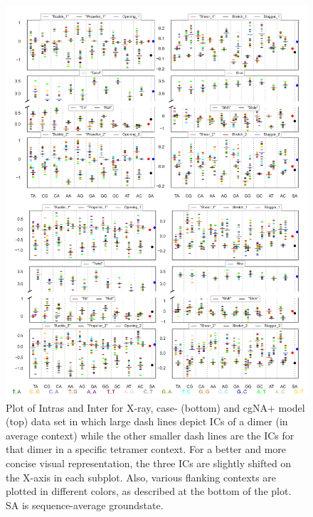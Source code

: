 \begin{figure}[H]
	\begin{center}
	\includegraphics[scale=1]{./Xray_images/seq_var_combine_X2.png}
	\caption{Plot of Intras and Inter for X-ray, case- (bottom) and cgNA$+$ model (top) data set in which large dash lines depict ICs of a dimer (in average context) while the other smaller dash lines are the ICs for that dimer in a specific tetramer context. For a better and more concise visual representation, the three ICs are slightly shifted on the X-axis in each subplot. Also, various flanking contexts are plotted in different colors, as described at the bottom of the plot. SA is sequence-average groundstate.
	}
\label{SIfig:seq_imp2}
\end{center}
\end{figure}

